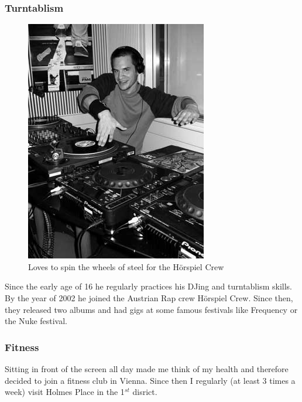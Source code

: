 
\subsubsection{Turntablism}

\begin{figure}[htb]
    \includegraphics{img/Christoph_Pickl_at_FM4.jpg}
    \caption{Loves to spin the wheels of steel for the H{\"o}rspiel Crew}
\end{figure}

Since the early age of 16 he regularly practices his DJing and
turntablism skills. By the year of 2002 he joined the Austrian Rap crew
H{\"o}rspiel Crew\cite{hsc}. Since then, they released two albums and had gigs
at some famous festivals like Frequency or the Nuke festival.

\subsubsection{Fitness}


Sitting in front of the screen all day made me think of my health and therefore
decided to join a fitness club in Vienna. Since then I regularly (at least 3
times a week) visit Holmes Place in the 1$^{st}$ disrict.


